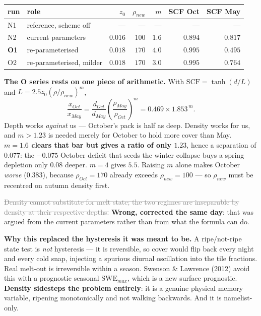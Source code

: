 \documentclass[10pt]{article}
\newcommand{\dead}[1]{\textcolor{gray}{\sout{#1}}}
\begin{document}
\begin{center}\footnotesize
\begin{tabular}{l l r r r r r}
\toprule
run & role & $z_0$ & $\rho_{new}$ & $m$ & SCF Oct & SCF May \\
\midrule
N1 & reference, scheme off & --- & --- & --- & --- & --- \\
N2 & current parameters & $0.016$ & $100$ & $1.6$ & $0.894$ & $0.817$ \\
\textbf{O1} & re-parameterised & $0.018$ & $170$ & $\mathbf{4.0}$ & $\mathbf{0.995}$ & $\mathbf{0.495}$ \\
O2 & re-parameterised, milder & $0.018$ & $170$ & $3.0$ & $0.995$ & $0.764$ \\
\bottomrule
\end{tabular}
\end{center}

\noindent \textbf{The O series rests on one piece of arithmetic.} With
$\mathrm{SCF}=\tanh(d/L)$ and $L=2.5z_0(\rho/\rho_{new})^m$,
\[
\frac{x_{Oct}}{x_{May}}=\frac{d_{Oct}}{d_{May}}\left(\frac{\rho_{May}}{\rho_{Oct}}\right)^{m}
= 0.469\times1.853^{\,m}.
\]
Depth works \emph{against} us --- October's pack is half as deep. Density works for us, and
$m>1.23$ is needed merely for October to hold more cover than May. \textbf{$m=1.6$ clears that
bar but gives a ratio of only $1.23$}, hence a separation of $0.077$: the $-0.075$ October
deficit that seeds the winter collapse buys a spring depletion only $0.08$ deeper. $m=4$ gives
$5.5$. Raising $m$ alone makes October \emph{worse} ($0.383$), because $\rho_{Oct}=170$ already
exceeds $\rho_{new}=100$ --- so $\rho_{new}$ must be recentred on autumn density first.

\dead{Density cannot substitute for melt state; the two regimes are inseparable by density at
their respective depths.} \textbf{Wrong, corrected the same day}: that was argued from the
current parameters rather than from what the formula can do.

\textbf{Why this replaced the hysteresis it was meant to be.} A ripe/not-ripe state test is
\emph{not} hysteresis --- it is reversible, so cover would flip back every night and every cold
snap, injecting a spurious diurnal oscillation into the tile fractions. Real melt-out is
irreversible within a season. Swenson \& Lawrence (2012) avoid this with a prognostic seasonal
$\mathrm{SWE}_{max}$, which is a new surface prognostic. \textbf{Density sidesteps the problem
entirely}: it is a genuine physical memory variable, ripening monotonically and not walking
backwards. And it is namelist-only.
\end{document}
